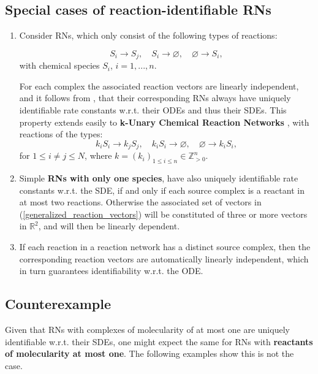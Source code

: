\documentclass[10pt,a4paper]{amsart}
\let\emptyset\varnothing
\theoremstyle{definition}
\theoremstyle{remark}
\theoremstyle{consequence}
\numberwithin{equation}{section}
\begin{document}
\subsection{Special cases of reaction-identifiable RNs}
\begin{enumerate}

    \item Consider RNs, which only consist of the following types of reactions: 

$$S_i\rightarrow  S_j, \quad  S_i\rightarrow \emptyset, \quad \emptyset \rightarrow S_i ,$$
with chemical species $S_i$, $i=1,...,n$. 

For each complex the associated reaction vectors are linearly independent, and it follows from \cite[Theorem 3.2]{ident_CRNs}, that their corresponding RNs always have uniquely identifiable rate constants w.r.t. their ODEs and thus their SDEs.
This property extends easily to \textbf{k-Unary Chemical Reaction Networks} \cite{laurence2025analysis}, with reactions of the types: $$k_i S_i\rightarrow k_j S_j, \quad  k_i S_i\rightarrow \emptyset, \quad \emptyset \rightarrow k_i S_i ,$$
for $1 \leq i \neq j \leq N$, where $k = (k_i)_{1\leq i \leq n} \in \mathbb{Z}^n_{>0}$.


\item Simple \textbf{RNs with only one species}, have also uniquely identifiable rate constants w.r.t. the  SDE,
 if and only if each source complex is a reactant in at most two reactions. Otherwise the associated set of vectors in (\ref{generalized_reaction_vectors}) will be constituted of three or more vectors in $\mathbb{R}^2$, and will then be linearly dependent.


\item If each reaction in a reaction network has a distinct source complex, then the corresponding reaction vectors are automatically linearly independent, which in turn guarantees identifiability w.r.t. the ODE.
\end{enumerate}


\subsection{Counterexample}
Given that RNs with complexes of molecularity of at most one are uniquely identifiable w.r.t. their SDEs,
 one might expect the same 
for RNs with \textbf{reactants of molecularity at most one}. The following examples show this is not the case.
\end{document}

